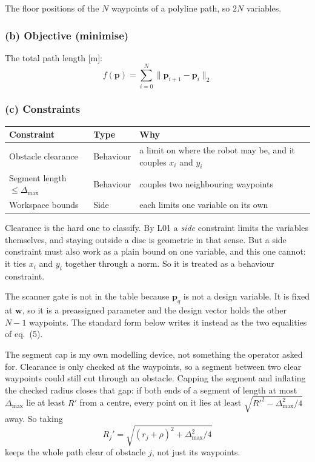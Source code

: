 \documentclass[11pt,a4paper]{article}
\begin{document}
The floor positions of the $N$ waypoints of a polyline path, so $2N$ variables.

\subsubsection*{(b) Objective (minimise)}

The total path length [m]:
\[
  f(\bm{p}) = \sum_{i=0}^{N} \lVert \bm{p}_{i+1} - \bm{p}_i \rVert_2
\]

\subsubsection*{(c) Constraints}

\begin{center}
\begin{tabular}{llp{6.2cm}}
\toprule
Constraint & Type & Why \\
\midrule
Obstacle clearance     & Behaviour & a limit on where the robot may be, and it couples $x_i$ and $y_i$ \\
Segment length $\le \Delta_{\max}$ & Behaviour & couples two neighbouring waypoints \\
Workspace bounds       & Side      & each limits one variable on its own \\
\bottomrule
\end{tabular}
\end{center}

Clearance is the hard one to classify. By L01 a \emph{side} constraint limits
the variables themselves, and staying outside a disc is geometric in that sense.
But a side constraint must also work as a plain bound on one variable, and this
one cannot: it ties $x_i$ and $y_i$ together through a norm. So it is treated as
a behaviour constraint.

The scanner gate is not in the table because $\bm{p}_q$ is not a design
variable. It is fixed at $\bm{w}$, so it is a preassigned parameter and the
design vector holds the other $N-1$ waypoints. The standard form below writes it instead as the two equalities of eq.~(5).

The segment cap is my own modelling device, not something the operator asked
for. Clearance is only checked at the waypoints, so a segment between two clear
waypoints could still cut through an obstacle. Capping the segment and
inflating the checked radius closes that gap: if both ends of a segment of
length at most $\Delta_{\max}$ lie at least $R'$ from a centre, every point on
it lies at least $\sqrt{R'^2 - \Delta_{\max}^2/4}$ away. So taking
\[
  R_j' = \sqrt{(r_j + \rho)^2 + \Delta_{\max}^2/4}
\]
keeps the whole path clear of obstacle $j$, not just its waypoints.
\end{document}
